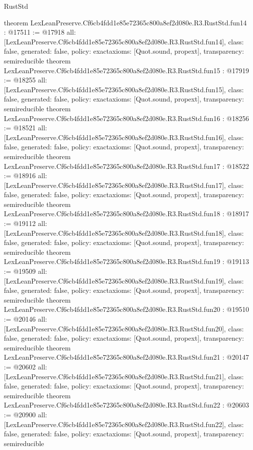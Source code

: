 \begin{lexlean}{RustStd}
\begin{coremodule}
{}
theorem LexLeanPreserve.Cf6cb4fdd1e85e72365c800a8ef2d080e.R3.RustStd.fun14 : @17511 := @17918 {
  all: [LexLeanPreserve.Cf6cb4fdd1e85e72365c800a8ef2d080e.R3.RustStd.fun14],
  class: false,
  generated: false,
  policy: exact{axioms: [Quot.sound, propext]},
  transparency: semireducible
}
theorem LexLeanPreserve.Cf6cb4fdd1e85e72365c800a8ef2d080e.R3.RustStd.fun15 : @17919 := @18255 {
  all: [LexLeanPreserve.Cf6cb4fdd1e85e72365c800a8ef2d080e.R3.RustStd.fun15],
  class: false,
  generated: false,
  policy: exact{axioms: [Quot.sound, propext]},
  transparency: semireducible
}
theorem LexLeanPreserve.Cf6cb4fdd1e85e72365c800a8ef2d080e.R3.RustStd.fun16 : @18256 := @18521 {
  all: [LexLeanPreserve.Cf6cb4fdd1e85e72365c800a8ef2d080e.R3.RustStd.fun16],
  class: false,
  generated: false,
  policy: exact{axioms: [Quot.sound, propext]},
  transparency: semireducible
}
theorem LexLeanPreserve.Cf6cb4fdd1e85e72365c800a8ef2d080e.R3.RustStd.fun17 : @18522 := @18916 {
  all: [LexLeanPreserve.Cf6cb4fdd1e85e72365c800a8ef2d080e.R3.RustStd.fun17],
  class: false,
  generated: false,
  policy: exact{axioms: [Quot.sound, propext]},
  transparency: semireducible
}
theorem LexLeanPreserve.Cf6cb4fdd1e85e72365c800a8ef2d080e.R3.RustStd.fun18 : @18917 := @19112 {
  all: [LexLeanPreserve.Cf6cb4fdd1e85e72365c800a8ef2d080e.R3.RustStd.fun18],
  class: false,
  generated: false,
  policy: exact{axioms: [Quot.sound, propext]},
  transparency: semireducible
}
theorem LexLeanPreserve.Cf6cb4fdd1e85e72365c800a8ef2d080e.R3.RustStd.fun19 : @19113 := @19509 {
  all: [LexLeanPreserve.Cf6cb4fdd1e85e72365c800a8ef2d080e.R3.RustStd.fun19],
  class: false,
  generated: false,
  policy: exact{axioms: [Quot.sound, propext]},
  transparency: semireducible
}
theorem LexLeanPreserve.Cf6cb4fdd1e85e72365c800a8ef2d080e.R3.RustStd.fun20 : @19510 := @20146 {
  all: [LexLeanPreserve.Cf6cb4fdd1e85e72365c800a8ef2d080e.R3.RustStd.fun20],
  class: false,
  generated: false,
  policy: exact{axioms: [Quot.sound, propext]},
  transparency: semireducible
}
theorem LexLeanPreserve.Cf6cb4fdd1e85e72365c800a8ef2d080e.R3.RustStd.fun21 : @20147 := @20602 {
  all: [LexLeanPreserve.Cf6cb4fdd1e85e72365c800a8ef2d080e.R3.RustStd.fun21],
  class: false,
  generated: false,
  policy: exact{axioms: [Quot.sound, propext]},
  transparency: semireducible
}
theorem LexLeanPreserve.Cf6cb4fdd1e85e72365c800a8ef2d080e.R3.RustStd.fun22 : @20603 := @20900 {
  all: [LexLeanPreserve.Cf6cb4fdd1e85e72365c800a8ef2d080e.R3.RustStd.fun22],
  class: false,
  generated: false,
  policy: exact{axioms: [Quot.sound, propext]},
  transparency: semireducible
}
\end{coremodule}
\end{lexlean}
